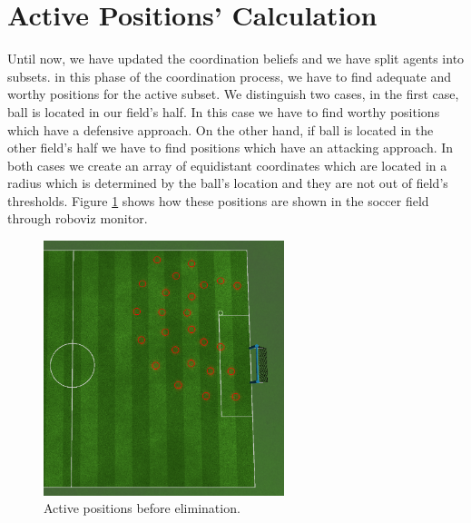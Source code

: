 \section{Active Positions' Calculation}
Until now, we have updated the coordination beliefs and we have split agents into subsets. in this phase of the coordination process, we have to find adequate and worthy positions for the active subset. We distinguish two cases, in the first case, ball is located in our field's half. In this case we have to find worthy positions which have a defensive approach. On the other hand, if ball is located in the other field's half we have to find positions which have an attacking approach. In both cases we create an array of equidistant coordinates which are located in a radius which is determined by the ball's location and they are not out of field's thresholds. Figure \ref{fig:ActivePositions2} shows how these positions are shown in the soccer field through roboviz monitor. 
\begin{figure}[htb!]
\centering
  \includegraphics[width=7cm]{Chapter4/figures/ActivePositions2.png}
  \caption{Active positions before elimination.} 
  \label{fig:ActivePositions2}
\end{figure}

